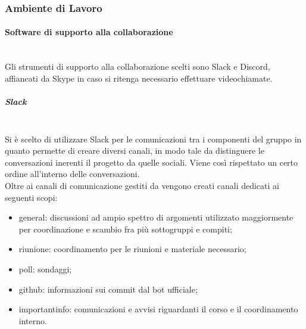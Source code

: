 \subsubsection{Ambiente di Lavoro}

\paragraph{Software di supporto alla collaborazione}\mbox{}\\
Gli strumenti di supporto alla collaborazione scelti sono Slack e Discord, affiancati da Skype in caso si ritenga necessario effettuare videochiamate.

\subparagraph{Slack}\mbox{}\\
Si è scelto di utilizzare Slack per le comunicazioni tra i componenti del gruppo in quanto permette di creare diversi canali, in modo tale da distinguere le conversazioni inerenti il progetto da quelle sociali. Viene così rispettato un certo ordine all'interno delle conversazioni.\\
Oltre ai canali di comunicazione gestiti da \Proponente{} vengono creati canali dedicati ai seguenti scopi:
\begin{itemize}
	\item general: discussioni ad ampio spettro di argomenti utilizzato maggiormente per coordinazione e scambio fra più sottogruppi e compiti;
	\item riunione: coordinamento per le riunioni e materiale necessario;
	\item poll: sondaggi;
	\item github: informazioni sui commit dal bot ufficiale;
	\item importantinfo: comunicazioni e avvisi riguardanti il corso e il coordinamento interno.
\end{itemize}


